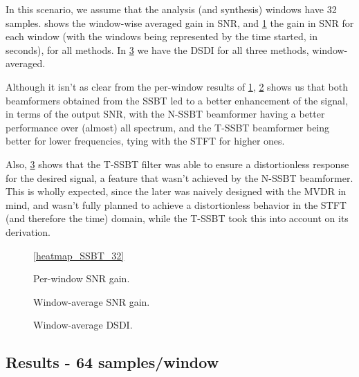In this scenario, we assume that the analysis (and synthesis) windows have 32 samples.  shows the window-wise averaged gain in SNR, and \cref{fig:heatmap_gain_32} the gain in SNR for each window (with the windows being represented by the time started, in seconds), for all methods. In \cref{fig:lineplot_dsdi_32} we have the DSDI for all three methods, window-averaged.

Although it isn't as clear from the per-window results of \cref{fig:heatmap_gain_32}, \cref{fig:lineplot_gain_32} shows us that both beamformers obtained from the SSBT led to a better enhancement of the signal, in terms of the output SNR, with the N-SSBT beamformer having a better performance over (almost) all spectrum, and the T-SSBT beamformer being better for lower frequencies, tying with the STFT for higher ones.

Also, \cref{fig:lineplot_dsdi_32} shows that the T-SSBT filter was able to ensure a distortionless response for the desired signal, a feature that wasn't achieved by the N-SSBT beamformer. This is wholly expected, since the later was naively designed with the MVDR in mind, and wasn't fully planned to achieve a distortionless behavior in the STFT (and therefore the time) domain, while the T-SSBT took this into account on its derivation. 



\begin{figure}[H]
	\centering
	
	
	\vspace*{0.4em}
	\ref*{heatmap_SSBT_32}
	\caption{Per-window SNR gain.}
	\label{fig:heatmap_gain_32}
\end{figure}

\begin{figure}[H]
\centering

\caption{Window-average SNR gain.}
\label{fig:lineplot_gain_32}
\end{figure}

\begin{figure}[H]
	\centering
	
	\caption{Window-average DSDI.}
	\label{fig:lineplot_dsdi_32}
\end{figure}
%
\subsection{Results - 64 samples/window}

